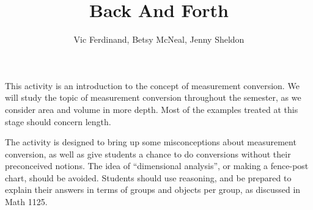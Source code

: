 \documentclass[handout]{ximera}
\title{Back And Forth}
\author{Vic Ferdinand, Betsy McNeal, Jenny Sheldon}
\begin{document}
\begin{abstract}\end{abstract}
\maketitle

\begin{instructorIntro}
This activity is an introduction to the concept of measurement conversion.  We will study the topic of measurement conversion throughout the semester, as we consider area and volume in more depth.  Most of the examples treated at this stage should concern length.

The activity is designed to bring up some misconceptions about measurement conversion, as well as give students a chance to do conversions without their preconceived notions.  The idea of ``dimensional analysis'', or making a fence-post chart, should be avoided.  Students should use reasoning, and be prepared to explain their answers in terms of groups and objects per group, as discussed in Math 1125.


\end{instructorIntro}
\end{document}
